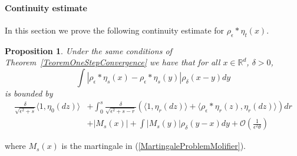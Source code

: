 \documentclass[12pt]{article}
\newtheorem{proposition}[theorem]{Proposition}
\newcommand{\IR}{\mathbb R}
\begin{document}
\paragraph{Continuity estimate}

In this section we prove the following continuity estimate for $\rho_\epsilon * \eta_t(x)$.
\begin{proposition} \label{ContinuityEstimate}
Under the same conditions of Theorem~\ref{TeoremOneStepConvergence} we have that for all $x \in \IR^d$, $\delta>0$,
\[
\int |\rho_\epsilon*\eta_s(x) -\rho_\epsilon*\eta_s(y)| \rho_\delta(x-y) dy \]
is bounded by
\begin{align*}
\frac{\delta}{\sqrt{\epsilon^2+s}} \langle 1,\eta_0(dz) \rangle &+ \int_0^s \frac{\delta}{\sqrt{\epsilon^2+s-r}} (\langle 1, \eta_r(dz)\rangle + \langle \rho_\epsilon*\eta_r(z), \eta_r(dz)\rangle)dr \\ &+ |M_s(x)| + \int |M_s(y)| \rho_\delta(y-x)dy + \mathcal{O}\left( \frac{1}{\epsilon^2 \theta}\right)
\end{align*} 
\end{proposition}
where $M_s(x)$ is the martingale in (\ref{MartingaleProblemMolifier}).
\end{document}
